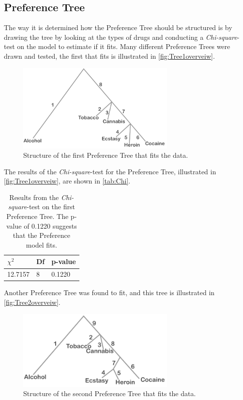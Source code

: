 \subsection*{Preference Tree}
%
The way it is determined how the Preference Tree should be structured is by drawing the tree by looking at the types of drugs and conducting a \textit{Chi-square}-test on the model to estimate if it fits. Many different Preference Trees were drawn and tested, the first that fits is illustrated in \autoref{fig:Tree1overveiw}.
%
\begin{figure}[H]
\centering
\includegraphics[width = 0.70\textwidth]{Figure/Tree1overview}
\caption{Structure of the first Preference Tree that fits the data.}
\label{fig:Tree1overveiw}
\end{figure}
\noindent
%
The results of the \textit{Chi-square}-test for the Preference Tree, illustrated in \autoref{fig:Tree1overveiw}, are shown in \autoref{tab:Chi}. 
%
\begin{table}[H]
\centering
\begin{tabular}{@{}lll@{}}
\toprule
$\chi^{2}$   & Df  & p-value \\ \midrule
12.7157      & 8   & 0.1220  \\ \bottomrule
\end{tabular}
\caption{Results from the \textit{Chi-square}-test on the first Preference Tree. The p-value of 0.1220 suggests that the Preference model fits.}
\label{tab:Chi1}
\end{table} 
\noindent
%
Another Preference Tree was found to fit, and this tree is illustrated in \autoref{fig:Tree2overveiw}. 
%
\begin{figure}[H]
\centering
\includegraphics[width = 0.70\textwidth]{Figure/Tree2overview}
\caption{Structure of the second Preference Tree that fits the data.}
\label{fig:Tree2overveiw}
\end{figure}
